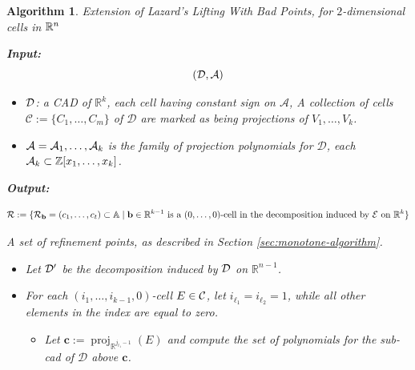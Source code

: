 \documentclass[
]{book}
\newtheorem{algorithm}{Algorithm}
\theoremstyle{definition}
\theoremstyle{definition}
\theoremstyle{definition}
\theoremstyle{definition}
\theoremstyle{remark}
\begin{document}
\begin{algorithm}Extension of Lazard's Lifting With Bad Points, for $2$-dimensional cells in $\mathbb{R}^n$

\citep[Extension of][Algorithm 5.15]{lazard10}

\textbf{Input:}
\[({\cal D}, {\cal A})\]

\begin{itemize}
\item
  \(\cal D\): a CAD of \(\mathbb{R}^k\), each cell having constant sign on \(\mathcal{A}\), A collection of cells \(\mathcal{C} := \{ C_1,\ldots,C_m \}\) of \(\mathcal{D}\) are marked as being projections of \(V_1,\ldots,V_k\).
\item
  \({\cal A} = {\cal A}_1,\ldots,{\cal A}_k\) is the family of projection polynomials for \(\mathcal{D}\), each \({\cal A}_k \subset \mathbb{Z}[x_1,\ldots,x_k]\).
\end{itemize}

\textbf{Output:}

\[
{\cal R} := \{ {\cal R}_{\mathbf{b}} = ( c_1,\ldots,c_t ) \subset \mathbb{A}\mid \mathbf{b} \in \mathbb{R}^{k-1} \text{ is a } (0,\ldots,0) \text{-cell in the decomposition induced by } {\cal E} \text{ on } \mathbb{R}^k \}
\]

A set of refinement points, as described in Section \ref{sec:monotone-algorithm}.

\begin{itemize}
\item
  Let \(\cal D'\) be the decomposition induced by \(\cal D\) on \(\mathbb{R}^{n-1}\).
\item
  For each \((i_1,\ldots,i_{k-1},0)\)-cell \(E \in \cal{C}\), let \(i_{\ell_1} = i_{\ell_2} = 1\), while all other elements in the index are equal to zero.

  \begin{itemize}
  \item
    Let \(\mathbf{c} := {\operatorname{proj}_{\mathbb{R}^{j_{\ell_1} - 1}}}(E)\) and compute the set of polynomials for the sub-cad of \(\mathcal{D}\) above \(\mathbf{c}\).


\end{itemize}
\end{itemize}
\end{algorithm}
\end{document}
